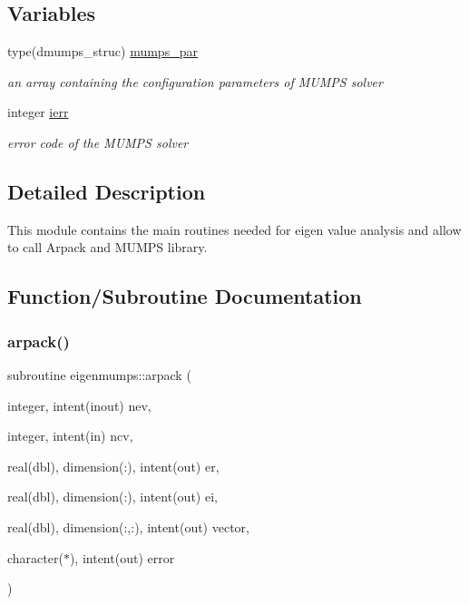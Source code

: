 \subsection*{Variables}
\begin{DoxyCompactItemize}
\item 
type(dmumps\+\_\+struc) \hyperlink{namespaceeigenmumps_a96a8141178a4cd84a24bd63b11685409}{mumps\+\_\+par}
\begin{DoxyCompactList}\small\item\em an array containing the configuration parameters of M\+U\+M\+PS solver \end{DoxyCompactList}\item 
integer \hyperlink{namespaceeigenmumps_a0b6d919fe610b180483db0dcba47ba1c}{ierr}
\begin{DoxyCompactList}\small\item\em error code of the M\+U\+M\+PS solver \end{DoxyCompactList}\end{DoxyCompactItemize}


\subsection{Detailed Description}
This module contains the main routines needed for eigen value analysis and allow to call Arpack and M\+U\+M\+PS library. 

\subsection{Function/\+Subroutine Documentation}
\mbox{\label{namespaceeigenmumps_a86ca8fa64997377eaafa9b3b69a86d49}} 
\subsubsection{\texorpdfstring{arpack()}{arpack()}}
{\footnotesize\ttfamily subroutine eigenmumps\+::arpack (\begin{DoxyParamCaption}\item[{integer, intent(inout)}]{nev,  }\item[{integer, intent(in)}]{ncv,  }\item[{real(dbl), dimension(\+:), intent(out)}]{er,  }\item[{real(dbl), dimension(\+:), intent(out)}]{ei,  }\item[{real(dbl), dimension(\+:,\+:), intent(out)}]{vector,  }\item[{character($\ast$), intent(out)}]{error }\end{DoxyParamCaption})\hspace{0.3cm}{\ttfamily [private]}}




